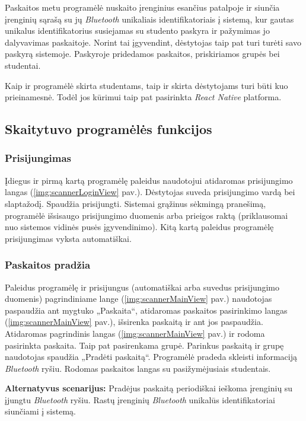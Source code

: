 \documentclass{VUMIFPSkursinis}
\begin{document}
Paskaitos metu programėlė nuskaito įrenginius esančius patalpoje ir siunčia įrenginių sąrašą su jų \textit{Bluetooth} unikaliais identifikatoriais į sistemą, kur gautas unikalus identifikatorius susiejamas su studento paskyra ir pažymimas jo dalyvavimas paskaitoje. Norint tai įgyvendint, dėstytojas taip pat turi turėti savo paskyrą sistemoje. Paskyroje pridedamos paskaitos, priskiriamos grupės bei studentai.

Kaip ir programėlė skirta studentams, taip ir skirta dėstytojams turi būti kuo prieinamesnė. Todėl jos kūrimui taip pat pasirinkta \textit{React Native} platforma.

\subsection{Skaitytuvo programėlės funkcijos}

\subsubsection{Prisijungimas}

Įdiegus ir pirmą kartą programėlę paleidus naudotojui atidaromas prisijungimo langas (\ref{img:scannerLoginView} pav.). Dėstytojas suveda prisijungimo vardą bei slaptažodį. Spaudžia prisijungti. Sistemai grąžinus sėkmingą pranešimą, programėlė išsisaugo prisijungimo duomenis arba prieigos raktą (priklausomai nuo sistemos vidinės pusės įgyvendinimo). Kitą kartą paleidus programėlę prisijungimas vyksta automatiškai.

\subsubsection{Paskaitos pradžia}

Paleidus programėlę ir prisijungus (automatiškai arba suvedus prisijungimo duomenis) pagrindiniame lange (\ref{img:scannerMainView} pav.) naudotojas paspaudžia ant mygtuko „Paskaita“, atidaromas paskaitos pasirinkimo langas (\ref{img:scannerMainView} pav.), išsirenka paskaitą ir ant jos paspaudžia. Atidaromas pagrindinis langas (\ref{img:scannerMainView} pav.) ir rodoma pasirinkta paskaita. Taip pat pasirenkama grupė. Parinkus paskaitą ir grupę naudotojas spaudžia „Pradėti paskaitą“. Programėlė pradeda skleisti informaciją \textit{Bluetooth} ryšiu. Rodomas paskaitos langas su pasižymėjusiais studentais.

\textbf{Alternatyvus scenarijus:} Pradėjus paskaitą periodiškai ieškoma įrenginių su įjungtu \textit{Bluetooth} ryšiu. Rastų įrenginių \textit{Bluetooth} unikalūs identifikatoriai siunčiami į sistemą.
\end{document}
